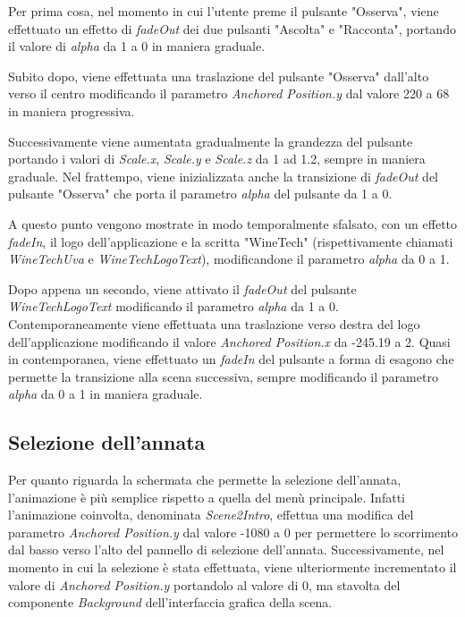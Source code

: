Per prima cosa, nel momento in cui l'utente preme il pulsante "Osserva", viene effettuato un effetto di \textit{fadeOut} dei due pulsanti "Ascolta" e "Racconta", portando il valore di \textit{alpha} da 1 a 0 in maniera graduale. 

Subito dopo, viene effettuata una traslazione del pulsante "Osserva" dall'alto verso il centro modificando il parametro \textit{Anchored Position.y} dal valore 220 a 68 in maniera progressiva. 

Successivamente viene aumentata gradualmente la grandezza del pulsante portando i valori di \textit{Scale.x}, \textit{Scale.y} e \textit{Scale.z} da 1 ad 1.2, sempre in maniera graduale. Nel frattempo, viene inizializzata anche la transizione di \textit{fadeOut} del pulsante "Osserva" che porta il parametro \textit{alpha} del pulsante da 1 a 0. 

A questo punto vengono mostrate in modo temporalmente sfalsato, con un effetto \textit{fadeIn}, il logo dell'applicazione e la scritta "WineTech" (rispettivamente chiamati \textit{WineTechUva} e \textit{WineTechLogoText}), modificandone il parametro \textit{alpha} da 0 a 1. 

Dopo appena un secondo, viene attivato il \textit{fadeOut} del pulsante \textit{WineTechLogoText} modificando il parametro \textit{alpha} da 1 a 0. Contemporaneamente viene effettuata una traslazione verso destra del logo dell'applicazione modificando il valore \textit{Anchored Position.x} da -245.19 a 2. Quasi in contemporanea, viene effettuato un \textit{fadeIn} del pulsante a forma di esagono che permette la transizione alla scena successiva, sempre modificando il parametro \textit{alpha} da 0 a 1 in maniera graduale.

\subsection{Selezione dell'annata}

Per quanto riguarda la schermata che permette la selezione dell'annata, l'animazione è più semplice rispetto a quella del menù principale. Infatti l'animazione coinvolta, denominata \textit{Scene2Intro}, effettua una modifica del parametro \textit{Anchored Position.y} dal valore -1080 a 0 per permettere lo scorrimento dal basso verso l'alto del pannello di selezione dell'annata. Successivamente, nel momento in cui la selezione è stata effettuata, viene ulteriormente incrementato il valore di \textit{Anchored Position.y} portandolo al valore di 0, ma stavolta del componente \textit{Background} dell'interfaccia grafica della scena.

